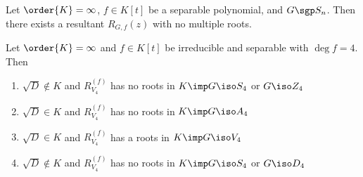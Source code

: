 \documentclass[a4paper]{article}
\begin{document}
\begin{ttheorem}
  Let \( \order{K}=\infty \), \( f\in K[t] \) be a separable polynomial, and \( G\sgp S_n \).
  Then there exists a resultant \( R_{G,f} (z) \) with no multiple roots.
\end{ttheorem}

\begin{ttheorem}
  Let \( \order{K} = \infty \) and \( f\in K[t] \) be irreducible and separable with \( \deg f = 4 \).
  Then \begin{enumerate}
    \item \( \sqrt D \not\in K\) and \( R_{V_4}^{(f)} \) has no roots in \( K \imp G\iso S_4 \) or \( G\iso Z_4 \)
    \item \( \sqrt D \in K\) and \( R_{V_4}^{(f)} \) has no roots in \( K \imp G\iso A_4 \)
    \item \( \sqrt D \in K\) and \( R_{V_4}^{(f)} \) has a roots in \( K \imp G\iso V_4 \)
    \item \( \sqrt D \not\in K\) and \( R_{V_4}^{(f)} \) has no roots in \( K \imp G\iso S_4 \) or \( G\iso D_4 \)
  \end{enumerate}
\end{ttheorem}
\end{document}
